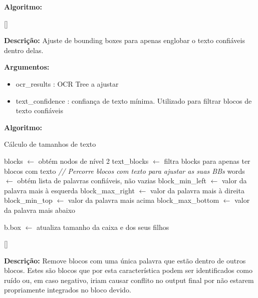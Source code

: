 \textbf{Algoritmo:}




[\normalsize]

\textbf{Descrição:} Ajuste de bounding boxes para apenas englobar o texto confiáveis dentro delas.

\textbf{Argumentos:}
\begin{itemize}\setlength\itemsep{-0.3em}
	\item ocr\_results : OCR Tree a ajustar
	\item text\_confidence : confiança de texto mínima. Utilizado para filtrar blocos de texto confiáveis
\end{itemize}

\textbf{Algoritmo:}

\begin{breakablealgorithm}
	\caption{Cálculo de tamanhos de texto}
	\begin{algorithmic}[1]
		
		\State blocks $\leftarrow$ obtém nodos de nível 2
		\State text\_blocks $\leftarrow$ filtra blocks para apenas ter blocos com texto
		\State \textit{// Percorre blocos com texto para ajustar as suas BBs}
			\State words $\leftarrow$ obtém lista de palavras confiáveis, não vazias
			\State block\_min\_left $\leftarrow$ valor da palavra mais à esquerda
			\State block\_max\_right $\leftarrow$ valor da palavra mais à direita
			\State block\_min\_top $\leftarrow$ valor da palavra mais acima
			\State block\_max\_bottom $\leftarrow$ valor da palavra mais abaixo
			
				\State b.box $\leftarrow$ atualiza tamanho da caixa e dos seus filhos
			\EndIf
		\EndFor

		
	\end{algorithmic}
\end{breakablealgorithm}




[\normalsize]

\textbf{Descrição:} Remove blocos com uma única palavra que estão dentro de outros blocos. Estes são blocos que por esta característica podem ser identificados como ruído ou, em caso negativo, iriam causar conflito no output final por não estarem propriamente integrados no bloco devido.

